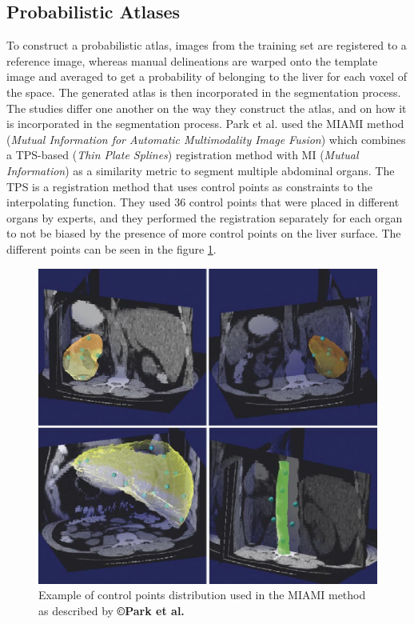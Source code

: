 \subsection{Probabilistic Atlases}

To construct a probabilistic atlas, images from the training set are
registered to a reference image, whereas manual delineations are warped
onto the template image and averaged to get a probability of belonging to the liver for each voxel of the space. The generated atlas is then
incorporated in the segmentation process. The studies differ one another
on the way they construct the atlas, and on how it is incorporated in
the segmentation process. 
Park et al. \cite{Park2003} used the MIAMI method (\emph{Mutual Information for Automatic
	Multimodality Image Fusion}) which combines a TPS-based (\emph{Thin
	Plate Splines}) registration method with MI (\emph{Mutual Information})
as a similarity metric to segment multiple abdominal organs. The TPS is a registration method that uses
control points as constraints to the interpolating function. They used
36 control points that were placed in different organs by experts, and
they performed the registration separately for each organ to not be
biased by the presence of more control points on the liver surface. The
different points can be seen in the figure \ref{Park2003_Fig1}.

\begin{figure}
	\centering
	\includegraphics[width=0.5\linewidth]{images/Park2003_Fig1}
	\caption{Example of control points distribution used in the MIAMI method as described by \textbf{©Park et al. \cite{Park2003}}}
	\label{Park2003_Fig1}
\end{figure}


